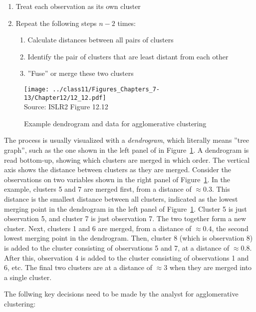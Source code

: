 \begin{enumerate}
   \item Treat each observation as its own cluster
   \item Repeat the following steps $n-2$ times:
   \begin{enumerate}
      \item Calculate distances between all pairs of clusters
      \item Identify the pair of clusters that are least distant from each other
      \item ''Fuse'' or merge these two clusters
   \end{enumerate}
\end{enumerate}

\begin{figure}
\centering
\texttt{[image: ../class11/Figures\_Chapters\_7-13/Chapter12/12\_12.pdf]} \\

\scriptsize Source: ISLR2 Figure 12.12
\caption{Example dendrogram and data for agglomerative clustering}
\label{fig:dendro1}
\end{figure}

The process is usually visualized with a \emph{dendrogram}, which literally means ''tree graph'', such as the one shown in the left panel of in Figure~\ref{fig:dendro1}. A dendrogram is read bottom-up, showing which clusters are merged in which order. The vertical axis shows the distance between clusters as they are merged. Consider the observations on two variables shown in the right panel of Figure~\ref{fig:dendro1}. In the example, clusters 5 and 7 are merged first, from a distance of $\approx 0.3$. This distance is the smallest distance between all clusters, indicated as the lowest merging point in the dendrogram in the left panel of Figure~\ref{fig:dendro1}. Cluster 5 is just observation 5, and cluster 7 is just observation 7. The two together form a new cluster. Next, clusters 1 and 6 are merged, from a distance of $\approx 0.4$, the second lowest merging point in the dendrogram. Then, cluster 8 (which is observation 8) is added to the cluster consisting of observations 5 and 7, at a distance of $\approx 0.8$. After this, observation 4 is added to the cluster consisting of observations 1 and 6, etc. The final two clusters are at a distance of $\approx 3$ when they are merged into a single cluster. 

The follwing key decisions need to be made by the analyst for agglomerative clustering:

